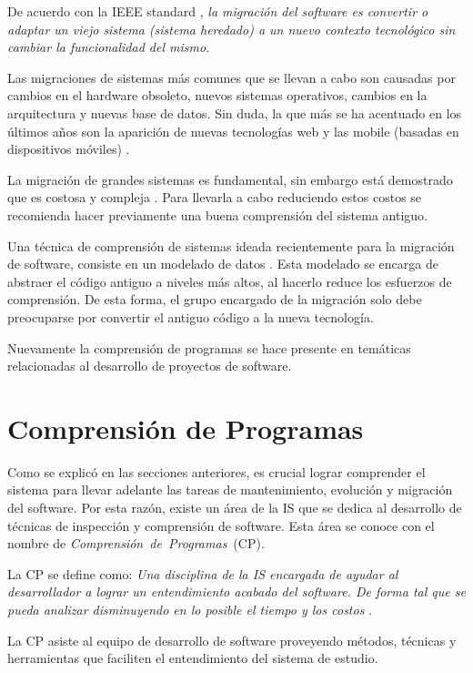 \documentclass[a4paper,12pt]{report}
\begin{document}
De acuerdo con la IEEE standard \cite{STD1219}, \textit{la migración del software es convertir o adaptar un viejo sistema (sistema heredado) a un nuevo contexto tecnológico sin cambiar la funcionalidad del mismo}.

Las migraciones de sistemas más comunes que se llevan a cabo son causadas por cambios en el hardware obsoleto, nuevos sistemas operativos, cambios en la arquitectura y nuevas base de datos. Sin duda, la que más se ha acentuado en los últimos años son la aparición de nuevas tecnologías web y las mobile (basadas en dispositivos móviles) \cite{MMFAF07}.
 
La migración de grandes sistemas es fundamental, sin embargo está demostrado que es costosa y compleja \cite{MMFAF07}. Para llevarla a cabo reduciendo estos costos se recomienda hacer previamente una buena comprensión del sistema antiguo. 

Una técnica de comprensión de sistemas ideada recientemente para la migración de software, consiste en un mode\-lado de datos \cite{WHAFVR11}. Esta modelado se encarga de abstraer el código antiguo a niveles más altos, al hacerlo reduce los esfuerzos de comprensión. De esta forma, el grupo encargado de la migración solo debe preocuparse por convertir el antiguo código a la nueva tecnología.

Nuevamente la comprensión de programas se hace presente en temáticas relacionadas al desarrollo de proyectos de software.

\section{Comprensión de Programas}

Como se explicó en las secciones anteriores, es crucial lograr comprender el sistema para llevar adelante las tareas de mantenimiento, evolución y migración del software.	
Por esta razón, existe un área de la IS que se dedica al desarrollo de técnicas de inspección y comprensión de software. Esta área se conoce con el nombre de \mbox{\textit{Comprensión de Programas} (CP).}

La CP se define como: \textit{Una disciplina de la IS encargada de ayudar al desarrollador a lograr un entendimiento acabado del software. De forma tal que se pueda analizar disminuyendo en lo posible el tiempo y los costos} \cite{MPMR07}.  

La CP asiste al equipo de desarrollo de software proveyendo métodos, técnicas y herramientas que faciliten el entendimiento del sistema de estudio.
\end{document}
